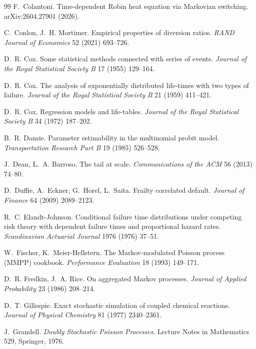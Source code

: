 \documentclass[11pt]{article}
\theoremstyle{remark}
\begin{document}
\begin{thebibliography}{99}
 F.~Colantoni. Time-dependent Robin heat
equation via Markovian switching. arXiv:2604.27901 (2026).

 C.~Conlon, J.~H. Mortimer.
Empirical properties of diversion ratios. \emph{RAND Journal of Economics} 52
(2021) 693--726.

 D.~R. Cox. Some statistical methods connected
with series of events. \emph{Journal of the Royal Statistical Society B} 17
(1955) 129--164.

 D.~R. Cox. The analysis of exponentially
distributed life-times with two types of failure. \emph{Journal of the Royal
Statistical Society B} 21 (1959) 411--421.

 D.~R. Cox. Regression models and life-tables.
\emph{Journal of the Royal Statistical Society B} 34 (1972) 187--202.

 B.~R. Dansie. Parameter estimability in the
multinomial probit model. \emph{Transportation Research Part B} 19 (1985)
526--528.

 J.~Dean, L.~A. Barroso. The tail
at scale. \emph{Communications of the ACM} 56 (2013) 74--80.

D.~Duffie, A.~Eckner, G.~Horel, L.~Saita. Frailty correlated default.
\emph{Journal of Finance} 64 (2009) 2089--2123.

 R.~C. Elandt-Johnson.
Conditional failure time distributions under competing risk theory with
dependent failure times and proportional hazard rates. \emph{Scandinavian
Actuarial Journal} 1976 (1976) 37--51.

 W.~Fischer,
K.~Meier-Hellstern. The Markov-modulated Poisson process (MMPP) cookbook.
\emph{Performance Evaluation} 18 (1993) 149--171.

 D.~R. Fredkin, J.~A. Rice. On
aggregated Markov processes. \emph{Journal of Applied Probability} 23 (1986)
208--214.

 D.~T. Gillespie. Exact stochastic
simulation of coupled chemical reactions. \emph{Journal of Physical Chemistry}
81 (1977) 2340--2361.

 J.~Grandell. \emph{Doubly Stochastic
Poisson Processes}. Lecture Notes in Mathematics 529, Springer, 1976.


\end{thebibliography}
\end{document}

